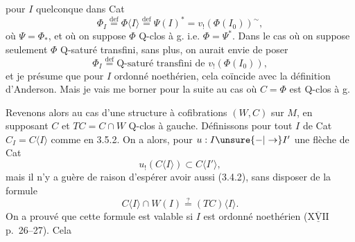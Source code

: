 pour $I$ quelconque dans Cat
\[
 \Phi_I\overset{\mathrm{def}}{=}\Phi\langle I\rangle\overset{\mathrm{def}}{=}\Psi(I)^*=v_!(\Phi(I_0))^{\sim},\tag*{(3.5.2)}
\]
où $\Psi=\Phi_*$, et où on suppose $\Phi$ Q-clos à g. i.e.
$\Phi=\Psi^*$. Dans le cas où on suppose
seulement $\Phi$ Q-saturé transfini, sans plus,
on aurait envie de poser
\[
 \Phi_I\overset{\mathrm{def}}{=}\text{Q-saturé transfini de }v_!(\Phi(I_0)),\tag*{(3.5.3)}
\]
et je présume que pour $I$ ordonné noethérien,
cela coïncide avec la définition d'Anderson.
Mais je vais me borner pour la suite au cas où
$C=\Phi$ est Q-clos à g.

Revenons alors au cas d'une structure à
cofibrations $(W,C)$ sur $M$, en supposant
$C$ et $TC=C\cap W$ Q-clos à gauche. Définissons
pour tout $I$ de Cat $C_I=C\langle I\rangle$ comme
en 3.5.2. On a alors, pour $u:I\unsure{-|\to}I'$ une
flèche de Cat
\[
 u_!(C\langle I\rangle)\subset C\langle I'\rangle,\tag*{(3.5.4)}
\]
mais il n'y a guère de raison d'espérer
avoir aussi (3.4.2), sans disposer de la
formule
\[
 C\langle I\rangle\cap W(I)\overset{?}{=}(TC)\langle I\rangle.\tag*{(3.5.5)}
\]
On a prouvé que cette formule est valable si $I$
est ordonné noethérien ($\underline{\overline{\mathrm{XVII}}}$  p.~26--27). Cela
